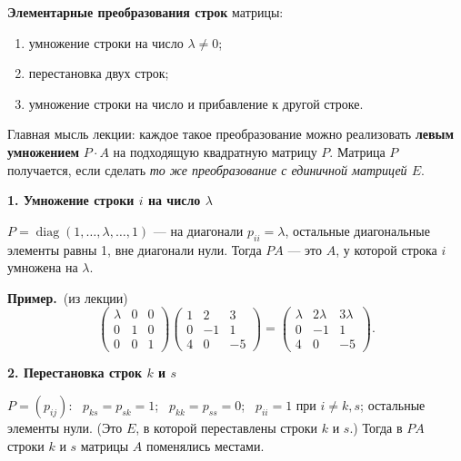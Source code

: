 \documentclass[a4paper,11pt]{article}
\DeclareMathOperator{\diag}{diag}
\newcommand{\prim}{\par\smallskip\noindent\textbf{\textcolor{teoc!80!black}{Пример.}}\ }
\newcommand{\podr}[1]{\par\needspace{8\baselineskip}\medskip
  {\large\bfseries\textcolor{oprc!80!black}{#1}}\par\nopagebreak\smallskip}
\begin{document}
\begin{opr}
\textbf{Элементарные преобразования строк} матрицы:
\begin{enumerate}[nosep]
  \item умножение строки на число $\lambda \ne 0$;
  \item перестановка двух строк;
  \item умножение строки на число и прибавление к другой строке.
\end{enumerate}
\end{opr}

Главная мысль лекции: каждое такое преобразование можно реализовать \textbf{левым умножением} $P \cdot A$ на подходящую
квадратную матрицу $P$. Матрица $P$ получается, если сделать \emph{то же преобразование с единичной матрицей $E$}.

\podr{1. Умножение строки $i$ на число $\lambda$}

\begin{opr}
$P = \diag(1, \dots, \lambda, \dots, 1)$ --- на диагонали $p_{ii} = \lambda$, остальные диагональные элементы равны 1,
вне диагонали нули. Тогда $PA$ --- это $A$, у которой строка $i$ умножена на $\lambda$.
\end{opr}

\prim (из лекции)
\[
  \begin{pmatrix} \lambda & 0 & 0 \\ 0 & 1 & 0 \\ 0 & 0 & 1 \end{pmatrix}
  \begin{pmatrix} 1 & 2 & 3 \\ 0 & -1 & 1 \\ 4 & 0 & -5 \end{pmatrix}
  = \begin{pmatrix} \lambda & 2\lambda & 3\lambda \\ 0 & -1 & 1 \\ 4 & 0 & -5 \end{pmatrix}.
\]

\podr{2. Перестановка строк $k$ и $s$}

\begin{opr}
$P = (p_{ij})$: \ $p_{ks} = p_{sk} = 1$; \ $p_{kk} = p_{ss} = 0$; \ $p_{ii} = 1$ при $i \ne k, s$; остальные элементы нули.
(Это $E$, в которой переставлены строки $k$ и $s$.) Тогда в $PA$ строки $k$ и $s$ матрицы $A$ поменялись местами.
\end{opr}
\end{document}
